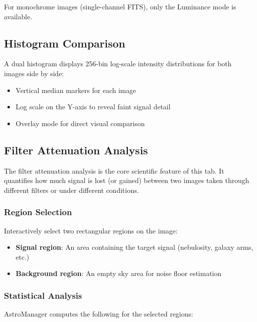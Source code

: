 \documentclass[11pt,a4paper]{article}
\begin{document}
For monochrome images (single-channel FITS), only the Luminance mode is available.

\subsection{Histogram Comparison}

A dual histogram displays 256-bin log-scale intensity distributions for both images side by side:

\begin{itemize}
    \item Vertical median markers for each image
    \item Log scale on the Y-axis to reveal faint signal detail
    \item Overlay mode for direct visual comparison
\end{itemize}

\subsection{Filter Attenuation Analysis}

The filter attenuation analysis is the core scientific feature of this tab. It quantifies how much signal is lost (or gained) between two images taken through different filters or under different conditions.

\subsubsection{Region Selection}

Interactively select two rectangular regions on the image:
\begin{itemize}
    \item \textbf{Signal region}: An area containing the target signal (nebulosity, galaxy arms, etc.)
    \item \textbf{Background region}: An empty sky area for noise floor estimation
\end{itemize}

\subsubsection{Statistical Analysis}

AstroManager computes the following for the selected regions:
\end{document}
